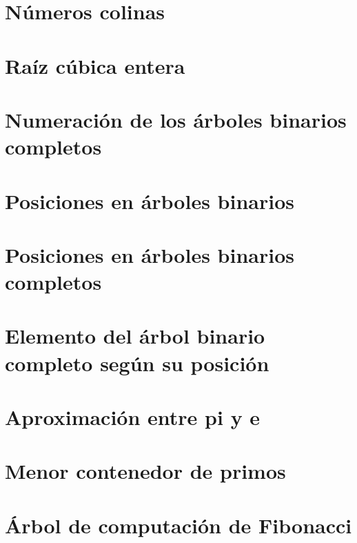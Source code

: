 \documentclass[a4paper,12pt,twoside]{book}
\begin{document}
\chapter{Números colinas}

\chapter{Raíz cúbica entera}

\chapter{Numeración de los árboles binarios completos}
\label{031218}

\chapter{Posiciones en árboles binarios}
\label{041218}

\chapter{Posiciones en árboles binarios completos}
\label{051218}

\chapter{Elemento del árbol binario completo según su
  posición}
\label{061218}

\chapter{Aproximación entre pi y e}
\label{071218}

\chapter{Menor contenedor de primos}
\label{101218}

\chapter{Árbol de computación de Fibonacci}
\label{111218}
\end{document}
